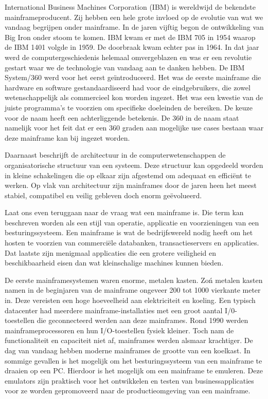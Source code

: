 International Business Machines Corporation (IBM) is wereldwijd de bekendste mainframeproducent. Zij hebben een hele grote invloed op de evolutie van wat we vandaag begrijpen onder mainframe. In de jaren vijftig begon de ontwikkeling van Big Iron onder stoom te komen. IBM kwam er met de IBM 705 in 1954 waarop de IBM 1401 volgde in 1959. De doorbraak kwam echter pas in 1964. In dat jaar werd de computergeschiedenis helemaal omvergeblazen en was er een revolutie gestart waar we de technologie van vandaag aan te danken hebben. De IBM System/360 werd voor het eerst geïntroduceerd. Het was de eerste mainframe die hardware en software gestandaardiseerd had voor de eindgebruikers, die zowel wetenschappelijk als commercieel kon worden ingezet. Het was een kwestie van de juiste programma's te voorzien om specifieke doeleinden de bereiken. De keuze voor de naam heeft een achterliggende betekenis. De 360 in de naam staat namelijk voor het feit dat er een 360 graden aan mogelijke use cases bestaan waar deze mainframe kan bij ingezet worden.

Daarnaast beschrijft de architectuur in de computerwetenschappen  de organisatorische structuur van een systeem. Deze structuur kan opgedeeld worden in kleine schakelingen die op elkaar zijn afgestemd om adequaat en efficiënt te werken. Op vlak van architectuur zijn mainframes door de jaren heen het meest stabiel, compatibel en veilig gebleven doch enorm geëvolueerd. 

Laat ons even teruggaan naar de vraag wat een mainframe is. Die term kan beschreven worden als een stijl van operatie, applicatie en voorzieningen van een besturingssysteem. Een mainframe is wat de bedrijfswereld nodig heeft om het hosten te voorzien van commerciële databanken, transactieservers en applicaties. Dat laatste zijn menigmaal applicaties die een grotere veiligheid en beschikbaarheid eisen dan wat kleinschalige machines kunnen bieden. 

De eerste mainframesystemen waren enorme, metalen kasten. Zo\'n metalen kasten namen in de beginjaren van de mainframe ongeveer 200 tot 1000 vierkante meter in. Deze vereisten een hoge hoeveelheid aan elektriciteit en koeling. Een typisch datacenter had meerdere mainframe-installaties met een groot aantal I/0-toestellen die geconnecteerd werden aan deze mainframes. Rond 1990 werden mainframeprocessoren en hun I/O-toestellen fysiek kleiner. Toch nam de functionaliteit en capaciteit niet af, mainframes werden alsmaar krachtiger. De dag van vandaag hebben moderne mainframes de grootte van een koelkast. In sommige gevallen is het mogelijk om het besturingssysteem van een mainframe te draaien op een PC. Hierdoor is het mogelijk om een mainframe te emuleren. Deze emulators zijn praktisch voor het ontwikkelen en testen van businessapplicaties voor ze worden gepromoveerd naar de productieomgeving van een mainframe. 

